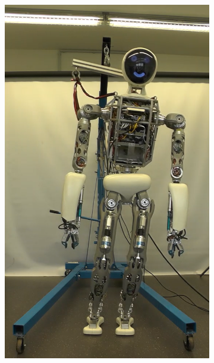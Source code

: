 \begin{figure}[h!]
\begin{subfigure}{.2\textwidth}
	\includegraphics[width=.95\linewidth]{experiments/balancing/2}
	\caption{}
\end{subfigure}%
\begin{subfigure}{.2\textwidth}

\end{subfigure}
\end{figure}

